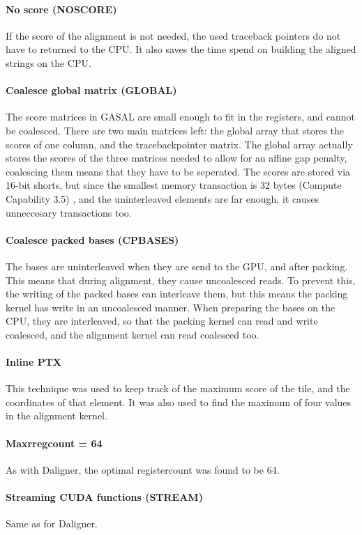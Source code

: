 \documentclass[../main/thesis.tex]{subfiles}
\begin{document}
\paragraph{No score (NOSCORE)}
If the score of the alignment is not needed, the used traceback pointers do not have to returned to the CPU.
It also saves the time spend on building the aligned strings on the CPU.


\paragraph{Coalesce global matrix (GLOBAL)}
The score matrices in GASAL are small enough to fit in the registers, and cannot be coalesced.
There are two main matrices left: the global array that stores the scores of one column, and the tracebackpointer matrix.
The global array actually stores the scores of the three matrices needed to allow for an affine gap penalty, coalescing them means that they have to be seperated.
The scores are stored via 16-bit shorts, but since the smallest memory transaction is 32 bytes (Compute Capability 3.5) \cite{cuda}, and the uninterleaved elements are far enough, it causes unneccesary transactions too.


\paragraph{Coalesce packed bases (CPBASES)}
The bases are uninterleaved when they are send to the GPU, and after packing.
This means that during alignment, they cause uncoalesced reads.
To prevent this, the writing of the packed bases can interleave them, but this means the packing kernel has write in an uncoalesced manner.
When preparing the bases on the CPU, they are interleaved, so that the packing kernel can read and write coalesced, and the alignment kernel can read coalesced too.

\paragraph{Inline PTX}
This technique was used to keep track of the maximum score of the tile, and the coordinates of that element.
It was also used to find the maximum of four values in the alignment kernel.

\paragraph{Maxrregcount = 64}
As with Daligner, the optimal registercount was found to be 64.

\paragraph{Streaming CUDA functions (STREAM)}
Same as for Daligner.
\end{document}
